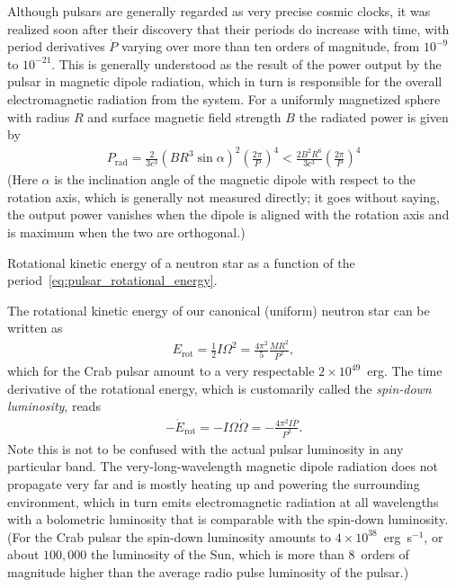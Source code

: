 Although pulsars are generally regarded as very precise cosmic clocks, it was realized
soon after their discovery that their periods do increase with time, with period
derivatives $\dot{P}$ varying over more than ten orders of magnitude, from $10^{-9}$ to $10^{-21}$. This is
generally understood as the result of the power output by the pulsar in magnetic
dipole radiation, which in turn is responsible for the overall electromagnetic
radiation from the system. For a uniformly magnetized sphere with radius $R$ and
surface magnetic field strength $B$ the radiated power is given by
\begin{align}
  P_\text{rad} = \frac{2}{3c^3} (BR^3 \sin\alpha)^2 \left( \frac{2\pi}{P} \right)^4 <
  \frac{2B^2 R^6}{3c^3} \left( \frac{2\pi}{P} \right)^4
\end{align}
(Here $\alpha$ is the inclination angle of the magnetic dipole with respect to the
rotation axis, which is generally not measured directly; it goes without saying,
the output power vanishes when the dipole is aligned with the rotation axis and
is maximum when the two are orthogonal.)

\begin{marginfigure}
  
  \caption{Rotational kinetic energy of a neutron star as a function of the
    period~\eqref{eq:pulsar_rotational_energy}.}
  \label{fig:pulsar_rotational_energy}
\end{marginfigure}

The rotational kinetic energy of our canonical (uniform) neutron star can be written as
\begin{align}\label{eq:pulsar_rotational_energy}
  E_\text{rot} = \frac{1}{2} I \Omega^2 = \frac{4\pi^2}{5} \frac{M R^2}{P^2},
\end{align}
which for the Crab pulsar amount to a very respectable $2 \times 10^{49}$~erg.
The time derivative of the rotational energy, which is customarily called the
\emph{spin-down luminosity}, reads
\begin{align*}
  -\dot{E}_\text{rot} = -I \Omega\dot{\Omega} = -\frac{4\pi^2 I\dot{P}}{P^3}.
\end{align*}
Note this is not to be confused with the actual pulsar luminosity in any particular
band. The very-long-wavelength magnetic dipole radiation does not propagate very far
and is mostly heating up and powering the surrounding environment, which in turn
emits electromagnetic radiation at all wavelengths with a bolometric luminosity
that is comparable with the spin-down luminosity. (For the Crab pulsar the spin-down
luminosity amounts to $4 \times 10^{38}$~erg~s$^{-1}$, or about $100,000$ the luminosity
of the Sun, which is more than 8~orders of magnitude higher than the average
radio pulse luminosity of the pulsar.)

